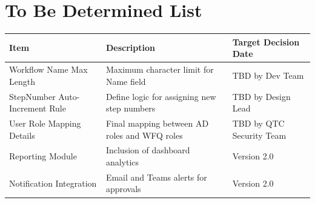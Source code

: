 \documentclass[12pt]{article}
\begin{document}
\section{To Be Determined List}
\begin{center}
\begin{tabular}{lll}
\toprule
Item & Description & Target Decision Date \\
\midrule
Workflow Name Max Length        & Maximum character limit for Name field              & TBD by Dev Team \\
StepNumber Auto-Increment Rule  & Define logic for assigning new step numbers         & TBD by Design Lead \\
User Role Mapping Details       & Final mapping between AD roles and WFQ roles        & TBD by QTC Security Team \\
Reporting Module                & Inclusion of dashboard analytics                    & Version 2.0 \\
Notification Integration        & Email and Teams alerts for approvals                & Version 2.0 \\
\bottomrule
\end{tabular}
\end{center}
\end{document}

